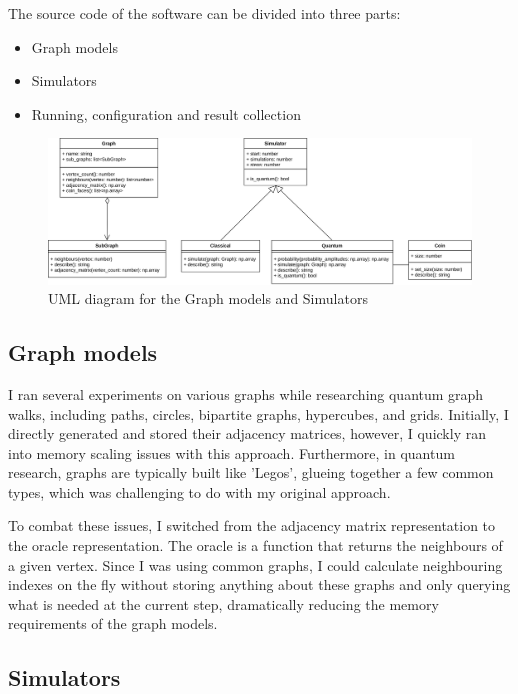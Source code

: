 The source code of the software can be divided into three parts:

\begin{itemize}
    \item Graph models
    \item Simulators
    \item Running, configuration and result collection
\end{itemize}

\begin{figure}[H]
  \includegraphics[width=\linewidth]{./figures/program/uml.png}
  \caption{UML diagram for the Graph models and Simulators}
\end{figure}

\subsection{Graph models}

I ran several experiments on various graphs while researching quantum graph walks, including paths, circles, bipartite graphs, hypercubes, and grids. Initially, I directly generated and stored their adjacency matrices, however, I quickly ran into memory scaling issues with this approach. Furthermore, in quantum research, graphs are typically built like 'Legos', glueing together a few common types, which was challenging to do with my original approach.

To combat these issues, I switched from the adjacency matrix representation to the oracle representation. The oracle is a function that returns the neighbours of a given vertex. Since I was using common graphs, I could calculate neighbouring indexes on the fly without storing anything about these graphs and only querying what is needed at the current step, dramatically reducing the memory requirements of the graph models.

\subsection{Simulators}

